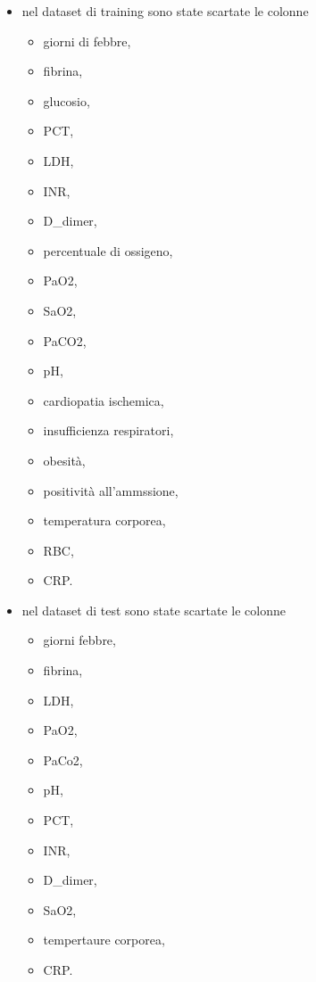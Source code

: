 \begin{itemize}
    \item nel dataset di training sono state scartate le colonne
    \begin{itemize}
        \item giorni di febbre, 
        \item fibrina, 
        \item glucosio, 
        \item PCT, 
        \item LDH, 
        \item INR, 
        \item D\_dimer, 
        \item percentuale di ossigeno, 
        \item PaO2, 
        \item SaO2, 
        \item PaCO2, 
        \item pH, 
        \item cardiopatia ischemica,
        \item insufficienza respiratori,
        \item obesità, 
        \item positività all'ammssione, 
        \item temperatura corporea, 
        \item RBC, 
        \item CRP.
    \end{itemize} 
    \item nel dataset di test sono state scartate le colonne
    \begin{itemize}
        \item giorni febbre, 
        \item fibrina, 
        \item LDH,
        \item PaO2,
        \item PaCo2, 
        \item pH, 
        \item PCT, 
        \item INR,
        \item D\_dimer, 
        \item SaO2, 
        \item tempertaure corporea, 
        \item CRP.
    \end{itemize} 
\end{itemize} 


